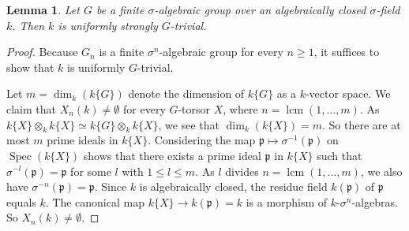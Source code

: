 \documentclass[oneside,reqno]{amsart}
\newtheorem{lemma}[theo]{Lemma}
\theoremstyle{definition}
\newcommand{\p}{\mathfrak{p}}
\newcommand{\spec}{\operatorname{Spec}}
\newcommand{\s}{\sigma}
\newcommand{\lcm}{\operatorname{lcm}}
\begin{document}
% 	
% 

\begin{lemma} \label{lemma: finite case}
	Let $G$ be a finite $\s$-algebraic group over an algebraically closed $\s$-field $k$. Then $k$ is uniformly strongly $G$-trivial.
\end{lemma}
\begin{proof}
	Because $G_n$ is a finite $\s^n$-algebraic group for every $n\geq 1$, it suffices to show that $k$ is uniformly $G$-trivial.
	
	Let $m=\dim_k(k\{G\})$ denote the dimension of $k\{G\}$ as a $k$-vector space. We claim that $X_n(k)\neq\emptyset$ for every $G$-torsor $X$, where $n=\lcm(1,\ldots,m)$. As $k\{X\}\otimes_k k\{X\}\simeq k\{G\}\otimes_k k\{X\}$, we see that $\dim_k (k\{X\})=m$. So there are at most $m$ prime ideals in $k\{X\}$. Considering the map $\p\mapsto\s^{-1}(\p)$ on $\spec(k\{X\})$ shows that there exists a prime ideal $\p$ in $k\{X\}$ such that $\s^{-l}(\p)=\p$ for some $l$ with $1\leq l\leq m$. As $l$ divides $n=\lcm(1,\ldots,m)$, we also have $\s^{-n}(\p)=\p$. Since $k$ is algebraically closed, the residue field $k(\p)$ of $\p$ equals $k$. The canonical map $k\{X\}\to k(\p)=k$ is a morphism of $k$-$\s^n$-algebras. So $X_n(k)\neq\emptyset$.
\end{proof}


 
 
\end{document}
